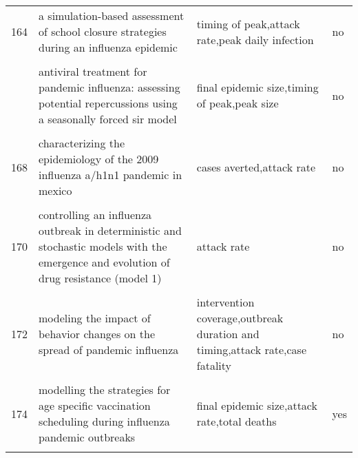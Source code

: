 \documentclass[
]{article}
\begin{document}
\begin{landscape}
\begin{longtable}{l>{\raggedright\arraybackslash}p{4cm}>{\raggedright\arraybackslash}p{6cm}l}
164 & a simulation-based assessment of school closure strategies during an influenza epidemic & timing of peak,attack rate,peak daily infection & no\\
\cellcolor{gray!6}{165} & \cellcolor{gray!6}{agent-based modeling of the spread of influenza-like illness in an emergency department: a simulation study} & \cellcolor{gray!6}{final epidemic size} & \cellcolor{gray!6}{yes}\\
\addlinespace
166 & antiviral treatment for pandemic influenza: assessing potential repercussions using a seasonally forced sir model & final epidemic size,timing of peak,peak size & no\\
\cellcolor{gray!6}{167} & \cellcolor{gray!6}{can antiviral drugs contain pandemic influenza transmission?} & \cellcolor{gray!6}{final epidemic size,attack rate} & \cellcolor{gray!6}{no}\\
168 & characterizing the epidemiology of the 2009 influenza a/h1n1 pandemic in mexico & cases averted,attack rate & no\\
\cellcolor{gray!6}{169} & \cellcolor{gray!6}{cholera epidemic in haiti, 2010: using a transmission model to explain spatial spread of disease and identify optimal control interventions} & \cellcolor{gray!6}{outbreak duration and timing,final epidemic size,timing of peak,cumulative hospital cases,date of first reported cases} & \cellcolor{gray!6}{no}\\
170 & controlling an influenza outbreak in deterministic and stochastic models with the emergence and evolution of drug resistance (model 1) & attack rate & no\\
\addlinespace
\cellcolor{gray!6}{171} & \cellcolor{gray!6}{modeling control strategies for concurrent epidemics of seasonal and pandemic h1n1 influenza} & \cellcolor{gray!6}{final epidemic size,cost} & \cellcolor{gray!6}{no}\\
172 & modeling the impact of behavior changes on the spread of pandemic influenza & intervention coverage,outbreak duration and timing,attack rate,case fatality & no\\
\cellcolor{gray!6}{173} & \cellcolor{gray!6}{modelling and analysis of influenza a (h1n1) on networks} & \cellcolor{gray!6}{final epidemic size} & \cellcolor{gray!6}{no}\\
174 & modelling the strategies for age specific vaccination scheduling during influenza pandemic outbreaks & final epidemic size,attack rate,total deaths & yes\\
\cellcolor{gray!6}{175} & \cellcolor{gray!6}{modelling the transmission dynamics and control of the novel 2009 swine influenza (h1n1) pandemic} & \cellcolor{gray!6}{final epidemic size,hospitalizations,case fatality} & \cellcolor{gray!6}{no}\\

\end{longtable}
\end{landscape}
\end{document}
